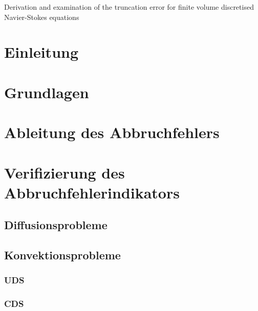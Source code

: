 \documentclass[bigchapter,twoside,report,11pt,type=bsc,colorback,accentcolor=tud2c]{tudthesis}
\begin{document}
%
{Derivation and examination of the truncation error for finite volume discretised Navier-Stokes equations}
\author{Paul Lange}
\dateofexam{\today}{\today}
\makethesistitle
{}

\tableofcontents
\listoffigures

\chapter{Einleitung}

\cleardoublepage

\chapter{Grundlagen}






\cleardoublepage




\chapter{Ableitung des Abbruchfehlers}
\label{chap:herleitung}





\chapter{Verifizierung des Abbruchfehlerindikators}
%
\section{Diffusionsprobleme}
\section{Konvektionsprobleme}
\subsection{UDS}
\subsection{CDS}
\end{document}
